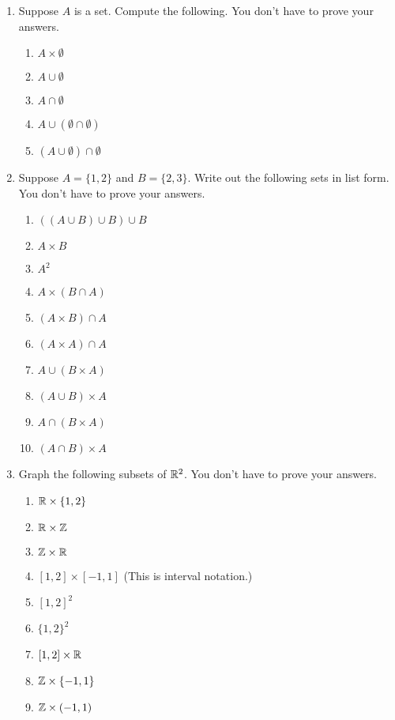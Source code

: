 \probsec{~\ref{sec:prod-union-inters}}
\begin{enumerate}
    \item Suppose $A$ is a set. Compute the following. You don't have to prove your answers.
  \begin{enumerate}
      \item $A \times \emptyset$
      \item $A \cup \emptyset$
      \item $A \cap \emptyset$
      \item $A \cup (\emptyset \cap \emptyset)$
      \item $(A \cup \emptyset) \cap \emptyset$
  \end{enumerate}

    \item Suppose $A = \{1, 2\}$ and $B = \{2, 3\}$. Write out the following sets in list form. You don't have to prove your answers.
  \begin{enumerate}
      \item $((A \cup B) \cup B) \cup B$
      \item $A \times B$
      \item $A^2$
      \item $A \times (B \cap A)$
      \item $(A \times B) \cap A$
      \item $(A \times A) \cap A$
      \item $A \cup (B \times A)$
      \item $(A \cup B) \times A$
      \item $A \cap (B \times A)$
      \item $(A \cap B) \times A$
  \end{enumerate}

    \item Graph the following subsets of $\mathbb{R}^2$. You don't have to prove your answers.
  \begin{enumerate}
      \item $\mathbb{R} \times \{1, 2\}$ 
      \item $\mathbb{R} \times \mathbb{Z}$
      \item $\mathbb{Z} \times \mathbb{R}$
      \item $[1,2] \times [-1,1]$ (This is interval notation.)
      \item $[1,2]^2$
      \item $\{1,2\}^2$
      \item $[1,2] \times \mathbb{R}$
      \item $\mathbb{Z} \times \{-1, 1\}$
      \item $\mathbb{Z} \times (-1,1)$
  \end{enumerate}


\end{enumerate}
